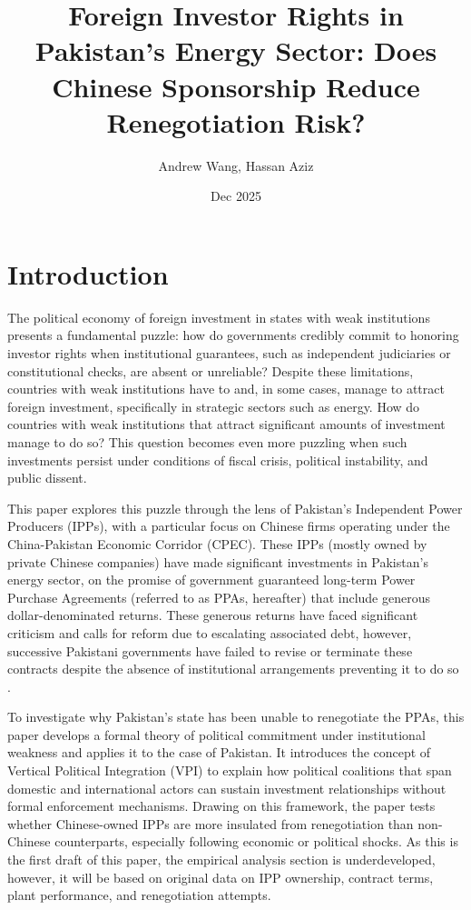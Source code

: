 \documentclass[12pt]{article}
\title{Foreign Investor Rights in Pakistan's Energy Sector: Does Chinese Sponsorship Reduce Renegotiation Risk?}
\author{Andrew Wang, Hassan Aziz}
\date{Dec 2025}
\begin{document}
\maketitle

\section{Introduction}
The political economy of foreign investment in states with weak institutions presents a fundamental puzzle: how do governments credibly commit to honoring investor rights when institutional guarantees, such as independent judiciaries or constitutional checks, are absent or unreliable? Despite these limitations, countries with weak institutions have to and, in some cases, manage to attract foreign investment, specifically in strategic sectors such as energy. How do countries with weak institutions that attract significant amounts of investment manage to do so? This question becomes even more puzzling when such investments persist under conditions of fiscal crisis, political instability, and public dissent.

This paper explores this puzzle through the lens of Pakistan’s Independent Power Producers (IPPs), with a particular focus on Chinese firms operating under the China-Pakistan Economic Corridor (CPEC). These IPPs (mostly owned by private Chinese companies) have made significant investments in Pakistan’s energy sector, on the promise of government guaranteed long-term Power Purchase Agreements (referred to as PPAs, hereafter) that include generous dollar-denominated returns. These generous returns have faced significant criticism and calls for reform due to escalating associated debt, however, successive Pakistani governments have failed to revise or terminate these contracts despite the absence of institutional arrangements preventing it to do so \citep{BusinessRecorder2024a}.

To investigate why Pakistan’s state has been unable to renegotiate the PPAs, this paper develops a formal theory of political commitment under institutional weakness and applies it to the case of Pakistan. It introduces the concept of Vertical Political Integration (VPI) to explain how political coalitions that span domestic and international actors can sustain investment relationships without formal enforcement mechanisms. Drawing on this framework, the paper tests whether Chinese-owned IPPs are more insulated from renegotiation than non-Chinese counterparts, especially following economic or political shocks. As this is the first draft of this paper, the empirical analysis section is underdeveloped, however, it will be based on original data on IPP ownership, contract terms, plant performance, and renegotiation attempts.
\end{document}
